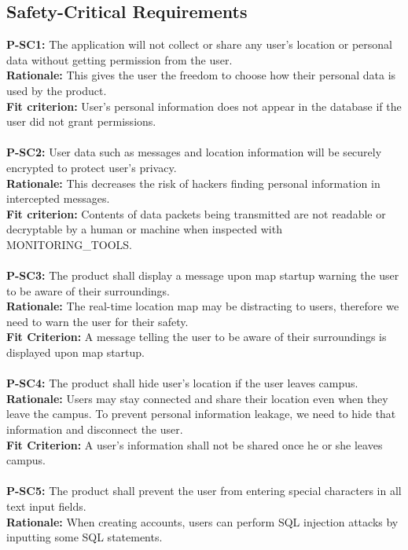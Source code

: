 \documentclass[12pt]{article}
\begin{document}
\subsection{Safety-Critical Requirements}
  \textbf{P-SC1:} The application will not collect or share any user’s location or personal data without getting permission from the user.\\
  \textbf{Rationale:} This gives the user the freedom to choose how their personal data is used by the product.\\
  \textbf{Fit criterion:} User’s personal information does not appear in the database if the user did not grant permissions.\\\\
  \textbf{P-SC2:} User data such as messages and location information will be securely encrypted to protect user’s privacy.\\
  \textbf{Rationale:} This decreases the risk of hackers finding personal information in intercepted messages.\\
  \textbf{Fit criterion:} Contents of data packets being transmitted are not readable or decryptable by a human or machine when inspected with MONITORING\_TOOLS.\\\\
  \textbf{P-SC3:} The product shall display a message upon map startup warning the user to be aware of their surroundings.\\
  \textbf{Rationale:} The real-time location map may be distracting to users, therefore we need to warn the user for their safety.\\
  \textbf{Fit Criterion:} A message telling the user to be aware of their surroundings is displayed upon map startup.\\\\
  \textbf{P-SC4:} The product shall hide user's location if the user leaves campus.\\
  \textbf{Rationale:} Users may stay connected and share their location even when they leave the campus. To prevent personal information leakage, we need to hide that information and disconnect the user.\\
  \textbf{Fit Criterion:} A user's information shall not be shared once he or she leaves campus.\\\\
  \textbf{P-SC5:} The product shall prevent the user from entering special characters in all text input fields.\\
  \textbf{Rationale:} When creating accounts, users can perform SQL injection attacks by inputting some SQL statements.\\
\end{document}
